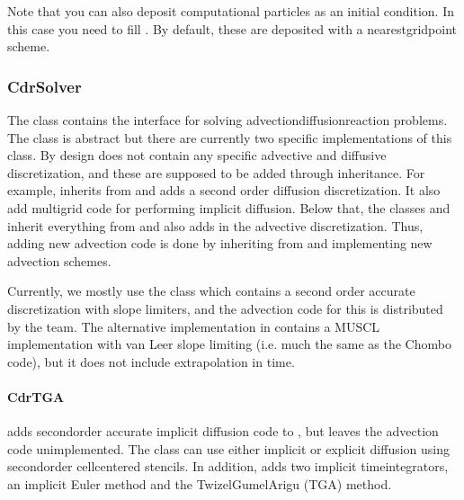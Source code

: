 \documentclass[letterpaper,10pt,english]{sphinxmanual}
\begin{document}
\sphinxAtStartPar
Note that you can also deposit computational particles as an initial condition.
In this case you need to fill .
By default, these are deposited with a nearest\sphinxhyphen{}grid\sphinxhyphen{}point scheme.


\subsubsection{CdrSolver}
\label{\detokenize{Solvers/CDR:cdrsolver}}
\sphinxAtStartPar
The  class contains the interface for solving advection\sphinxhyphen{}diffusion\sphinxhyphen{}reaction problems.
The class is abstract but there are currently two specific implementations of this class.
By design  does not contain any specific advective and diffusive discretization, and these are supposed to be added through inheritance.
For example,  inherits from  and adds a second order diffusion discretization.
It also add multigrid code for performing implicit diffusion.
Below that, the classes  and  inherit everything from  and also adds in the advective discretization.
Thus, adding new advection code is done by inheriting from  and implementing new advection schemes.

\sphinxAtStartPar
Currently, we mostly use the  class which contains a second order accurate discretization with slope limiters, and the advection code for this is distributed by the  team.
The alternative implementation in  contains a MUSCL implementation with van Leer slope limiting (i.e. much the same as the Chombo code), but it does not include extrapolation in time.


\paragraph{CdrTGA}
\label{\detokenize{Solvers/CDR:cdrtga}}
\sphinxAtStartPar
{} adds second\sphinxhyphen{}order accurate implicit diffusion code to , but leaves the advection code unimplemented.
The class can use either implicit or explicit diffusion using second\sphinxhyphen{}order cell\sphinxhyphen{}centered stencils.
In addition,  adds two implicit time\sphinxhyphen{}integrators, an implicit Euler method and the Twizel\sphinxhyphen{}Gumel\sphinxhyphen{}Arigu (TGA) method.
\end{document}
